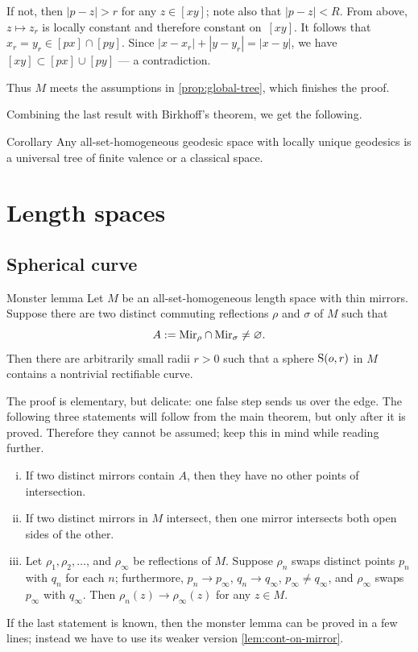 \documentclass[a4paper,10pt]{article}
\begin{document}
If not, then $|p-z|>r$ for any $z\in [xy]$;
note also that $|p-z|<R$.
From above, $z\mapsto z_r$ is locally constant and therefore constant on~$[xy]$.
It follows that $x_r=y_r\in [px]\cap[py]$.
Since $|x-x_r|+|y-y_r|=|x-y|$, we have $[xy]\subset [px]\cup[py]$ --- a contradiction.

Thus $M$ meets the assumptions in \ref{prop:global-tree}, which finishes the proof.
\qeds

Combining the last result with Birkhoff's theorem, we get the following.

\begin{thm}{Corollary}\label{thm:tree}
Any all-set-homogeneous geodesic space with locally unique geodesics is a universal tree of finite valence or a classical space.
\end{thm}

\section{Length spaces}

\subsection*{Spherical curve}

\begin{thm}{Monster lemma}\label{clm:rectifiable-curve}
Let $M$ be an all-set-homogeneous length space with thin mirrors.
Suppose there are two distinct commuting reflections $\rho$ and $\sigma$ of $M$ such that
\[A\mathrel{{:}{=}}\mathrm{Mir}_\rho\cap\mathrm{Mir}_\sigma\ne\varnothing.\]
Then there are arbitrarily small radii $r>0$ such that a sphere $\mathrm{S}(o,r)$ in $M$ contains a nontrivial rectifiable curve.
\end{thm}

The proof is elementary, but delicate: one false step sends us over the edge.
The following three statements will follow from the main theorem, but only after it is proved.
Therefore they cannot be assumed; keep this in mind while reading further.
\begin{enumerate}[(i)]
\item If two distinct mirrors contain $A$, then they have no other points of intersection.
\item If two distinct mirrors in $M$ intersect, then one mirror intersects both open sides of the other.
\item Let $\rho_1,\rho_2,\dots$, and $\rho_\infty$ be reflections of $M$.
Suppose $\rho_n$ swaps distinct points $p_n$ with $q_n$ for each $n$;
furthermore, $p_n\to p_\infty$, $q_n\to q_\infty$, $p_\infty\ne q_\infty$, and
$\rho_\infty$ swaps $p_\infty$ with $q_\infty$.
Then $\rho_n(z)\to \rho_\infty(z)$ for any $z\in M$.
\end{enumerate}
If the last statement is known, then the monster lemma can be proved in a few lines; instead we have to use its weaker version \ref{lem:cont-on-mirror}.
\end{document}
